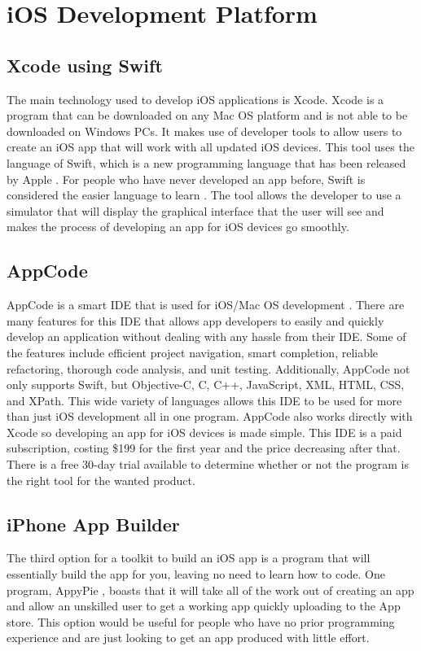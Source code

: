 \documentclass[letterpaper,10pt,draftclsnofoot,onecolumn,titlepage]{IEEEtran}
\begin{document}
	\section{iOS Development Platform}
	\subsection{Xcode using Swift}
	The main technology used to develop iOS applications is Xcode.
	Xcode is a program that can be downloaded on any Mac OS platform and is not able to be downloaded on Windows PCs.
	It makes use of developer tools to allow users to create an iOS app that will work with all updated iOS devices.
	This tool uses the language of Swift, which is a new programming language that has been released by Apple \cite{AppleSwift}.
	For people who have never developed an app before, Swift is considered the easier language to learn \cite{CodeChris}.
	The tool allows the developer to use a simulator that will display the graphical interface that the user will see and makes the process of developing an app for iOS devices go smoothly.

	\subsection{AppCode}
	AppCode is a smart IDE that is used for iOS/Mac OS development \cite{AppCode}.
	There are many features for this IDE that allows app developers to easily and quickly develop an application without dealing with any hassle from their IDE.
	Some of the features include efficient project navigation, smart completion, reliable refactoring, thorough code analysis, and unit testing.
	Additionally, AppCode not only supports Swift, but Objective-C, C, C++, JavaScript, XML, HTML, CSS, and XPath.
	This wide variety of languages allows this IDE to be used for more than just iOS development all in one program.
	AppCode also works directly with Xcode so developing an app for iOS devices is made simple.
	This IDE is a paid subscription, costing \$199 for the first year and the price decreasing after that.
	There is a free 30-day trial available to determine whether or not the program is the right tool for the wanted product.
	\subsection{iPhone App Builder}
	The third option for a toolkit to build an iOS app is a program that will essentially build the app for you, leaving no need to learn how to code.
	One program, AppyPie \cite{AppyPie}, boasts that it will take all of the work out of creating an app and allow an unskilled user to get a working app quickly uploading to the App store.
	This option would be useful for people who have no prior programming experience and are just looking to get an app produced with little effort.
\end{document}
